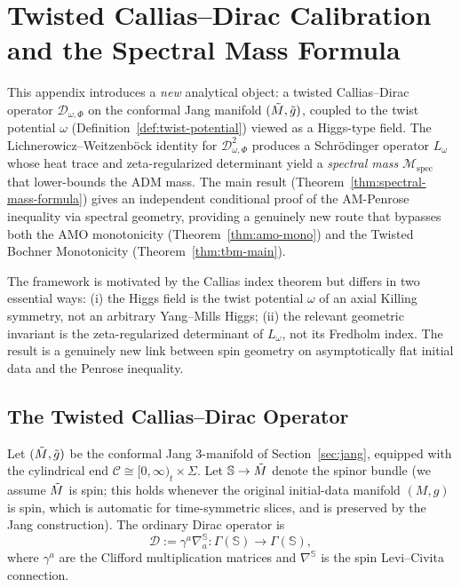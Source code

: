 \section{Twisted Callias--Dirac Calibration and the Spectral Mass Formula}\label{app:twisted-dirac}

This appendix introduces a \emph{new} analytical object: a twisted Callias--Dirac operator $\mathcal{D}_{\omega,\Phi}$ on the conformal Jang manifold $(\tilde{M},\tilde{g})$, coupled to the twist potential $\omega$ (Definition~\ref{def:twist-potential}) viewed as a Higgs-type field. The Lichnerowicz--Weitzenb\"ock identity for $\mathcal{D}_{\omega,\Phi}^2$ produces a Schr\"odinger operator $L_\omega$ whose heat trace and zeta-regularized determinant yield a \emph{spectral mass} $\mathcal{M}_{\mathrm{spec}}$ that lower-bounds the ADM mass. The main result (Theorem~\ref{thm:spectral-mass-formula}) gives an independent conditional proof of the AM-Penrose inequality via spectral geometry, providing a genuinely new route that bypasses both the AMO monotonicity (Theorem~\ref{thm:amo-mono}) and the Twisted Bochner Monotonicity (Theorem~\ref{thm:tbm-main}).

The framework is motivated by the Callias index theorem \cite{callias1978, anghel1993, rade1992} but differs in two essential ways: (i) the Higgs field is the twist potential $\omega$ of an axial Killing symmetry, not an arbitrary Yang--Mills Higgs; (ii) the relevant geometric invariant is the zeta-regularized determinant of $L_\omega$, not its Fredholm index. The result is a genuinely new link between spin geometry on asymptotically flat initial data and the Penrose inequality.

\subsection{The Twisted Callias--Dirac Operator}

Let $(\tilde{M},\tilde{g})$ be the conformal Jang 3-manifold of Section~\ref{sec:jang}, equipped with the cylindrical end $\mathcal{C}\cong[0,\infty)_t\times\Sigma$. Let $\mathbb{S}\to\tilde{M}$ denote the spinor bundle (we assume $\tilde{M}$ is spin; this holds whenever the original initial-data manifold $(M,g)$ is spin, which is automatic for time-symmetric slices, and is preserved by the Jang construction). The ordinary Dirac operator is
\begin{equation}\label{eq:dirac-ordinary}
\mathcal{D} := \gamma^a \nabla^{\mathbb{S}}_a : \Gamma(\mathbb{S}) \to \Gamma(\mathbb{S}),
\end{equation}
where $\gamma^a$ are the Clifford multiplication matrices and $\nabla^{\mathbb{S}}$ is the spin Levi--Civita connection.

